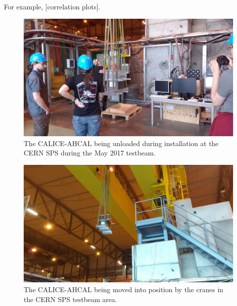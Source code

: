 For example, [correlation plots].

\begin{figure}[p]
	\centering
	\includegraphics[width=1\textwidth]{../Pictures/AHCAL-CERN-2017-Installation-1.jpg}
	\caption{The \acrshort{CALICE}-\acrshort{AHCAL} being unloaded during installation at the \acrshort{CERN} \acrshort{SPS} during the May 2017 testbeam.}
	\label{figure:aida/may2017/installation-1}
\end{figure}

\begin{figure}[p]
	\centering
	\includegraphics[width=1\textwidth]{../Pictures/AHCAL-CERN-2017-Installation-2.jpg}
	\caption{The \acrshort{CALICE}-\acrshort{AHCAL} being moved into position by the cranes in the \acrshort{CERN} \acrshort{SPS} testbeam area.}
	\label{figure:aida/may2017/installation-2}
\end{figure}

